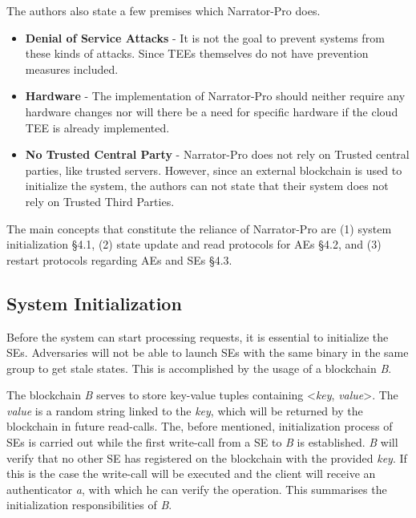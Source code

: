 The authors also state a few premises which Narrator-Pro does. 
\begin{itemize}
    \item \textbf{Denial of Service Attacks} - It is not the goal to prevent systems from these kinds of attacks. Since TEEs themselves do not have prevention measures included.  
    \item \textbf{Hardware} - The implementation of Narrator-Pro should neither require any hardware changes nor will there be a need for specific hardware if the cloud TEE is already implemented.  
    \item \textbf{No Trusted Central Party} - Narrator-Pro does not rely on Trusted central parties, like trusted servers. However, since an external blockchain is used to initialize the system, the authors can not state that their system does not rely on Trusted Third Parties.
\end{itemize} 

The main concepts that constitute the reliance of Narrator-Pro are (1) system initialization §4.1, (2) state update and read protocols for AEs §4.2, and (3) restart protocols regarding AEs and SEs §4.3.

\subsection{System Initialization}

Before the system can start processing requests, it is essential to initialize the SEs. Adversaries will not be able to launch SEs with the same binary in the same group to get stale states. This is accomplished by the usage of a blockchain \textit{B}. 

The blockchain \textit{B} serves to store key-value tuples containing <\textit{key}, \textit{value}>. The \textit{value} is a random string linked to the \textit{key}, which will be returned by the blockchain in future read-calls. The, before mentioned, initialization process of SEs is carried out while the first write-call from a SE to \textit{B} is established. \textit{B} will verify that no other SE has registered on the blockchain with the provided \textit{key}. If this is the case the write-call will be executed and the client will receive an authenticator \textit{a}, with which he can verify the operation. This summarises the initialization responsibilities of \textit{B}.

